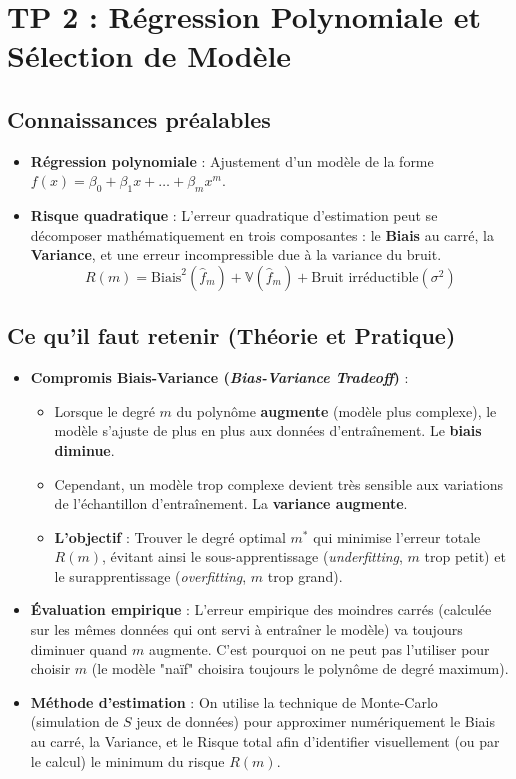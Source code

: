 \hrulefill

\section{TP 2 : Régression Polynomiale et Sélection de Modèle}

\subsection{Connaissances préalables}
\begin{itemize}
    \item \textbf{Régression polynomiale} : Ajustement d'un modèle de la forme $f(x) = \beta_0 + \beta_1 x + \dots + \beta_m x^m$. 
    \item \textbf{Risque quadratique} : L'erreur quadratique d'estimation peut se décomposer mathématiquement en trois composantes : le \textbf{Biais} au carré, la \textbf{Variance}, et une erreur incompressible due à la variance du bruit.
    $$ R(m) = \text{Biais}^2(\hat{f}_m) + \mathbb{V}(\hat{f}_m) + \text{Bruit irréductible} (\sigma^2) $$
\end{itemize}

\subsection{Ce qu'il faut retenir (Théorie et Pratique)}
\begin{itemize}
    \item \textbf{Compromis Biais-Variance (\textit{Bias-Variance Tradeoff})} :
    \begin{itemize}
        \item Lorsque le degré $m$ du polynôme \textbf{augmente} (modèle plus complexe), le modèle s'ajuste de plus en plus aux données d'entraînement. Le \textbf{biais diminue}.
        \item Cependant, un modèle trop complexe devient très sensible aux variations de l'échantillon d'entraînement. La \textbf{variance augmente}.
        \item \textbf{L'objectif} : Trouver le degré optimal $m^*$ qui minimise l'erreur totale $R(m)$, évitant ainsi le sous-apprentissage (\textit{underfitting}, $m$ trop petit) et le surapprentissage (\textit{overfitting}, $m$ trop grand).
    \end{itemize}
    \item \textbf{Évaluation empirique} : L'erreur empirique des moindres carrés (calculée sur les mêmes données qui ont servi à entraîner le modèle) va toujours diminuer quand $m$ augmente. C'est pourquoi on ne peut pas l'utiliser pour choisir $m$ (le modèle "naïf" choisira toujours le polynôme de degré maximum).
    \item \textbf{Méthode d'estimation} : On utilise la technique de Monte-Carlo (simulation de $S$ jeux de données) pour approximer numériquement le Biais au carré, la Variance, et le Risque total afin d'identifier visuellement (ou par le calcul) le minimum du risque $R(m)$.
\end{itemize}